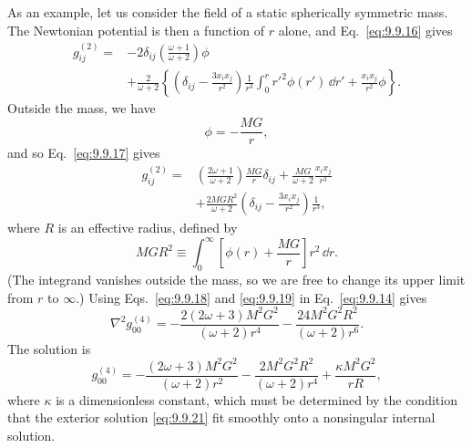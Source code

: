 As an example, let us consider the field of a static spherically symmetric
mass. The Newtonian potential is then a function of \(r\) alone, and
Eq.~\eqref{eq:9.9.16} gives
\begin{equation}
  \begin{split}
  g_{ij}^{(2)}
  ={}&
  -2\delta_{ij}\left(\frac{\omega+1}{\omega+2}\right)\phi\\
  &+\frac{2}{\omega+2}
  \left\{
    \left(\delta_{ij}-\frac{3x_ix_j}{r^2}\right)
    \frac1{r^3}\int_0^r r'^2\phi(r')\,\dd r'
    +\frac{x_ix_j}{r^2}\phi
  \right\}.
  \end{split}
  \tag{9.9.17}\label{eq:9.9.17}
\end{equation}
Outside the mass, we have
\begin{equation}
  \phi=-\frac{MG}{r},
  \tag{9.9.18}\label{eq:9.9.18}
\end{equation}
and so Eq.~\eqref{eq:9.9.17} gives
\begin{equation}
  \begin{split}
  g_{ij}^{(2)}
  ={}&
  \left(\frac{2\omega+1}{\omega+2}\right)
  \frac{MG}{r}\delta_{ij}
  +\frac{MG}{\omega+2}\frac{x_ix_j}{r^3}\\
  &+\frac{2MGR^2}{\omega+2}
  \left(\delta_{ij}-\frac{3x_ix_j}{r^2}\right)\frac1{r^3},
  \end{split}
  \tag{9.9.19}\label{eq:9.9.19}
\end{equation}
where \(R\) is an effective radius, defined by
\begin{equation}
  MGR^2
  \equiv
  \int_0^\infty
  \left[\phi(r)+\frac{MG}{r}\right]r^2\,\dd r.
  \tag{9.9.20}\label{eq:9.9.20}
\end{equation}
(The integrand vanishes outside the mass, so we are free to change its
upper limit from \(r\) to \(\infty\).) Using Eqs.~\eqref{eq:9.9.18} and
\eqref{eq:9.9.19} in Eq.~\eqref{eq:9.9.14} gives
\[
  \nabla^2g_{00}^{(4)}
  =
  -\frac{2(2\omega+3)M^2G^2}{(\omega+2)r^4}
  -\frac{24M^2G^2R^2}{(\omega+2)r^6}.
\]
The solution is
\begin{equation}
  g_{00}^{(4)}
  =
  -\frac{(2\omega+3)M^2G^2}{(\omega+2)r^2}
  -\frac{2M^2G^2R^2}{(\omega+2)r^4}
  +\frac{\kappa M^2G^2}{rR},
  \tag{9.9.21}\label{eq:9.9.21}
\end{equation}
where \(\kappa\) is a dimensionless constant, which must be determined by
the condition that the exterior solution \eqref{eq:9.9.21} fit smoothly
onto a nonsingular internal solution.

